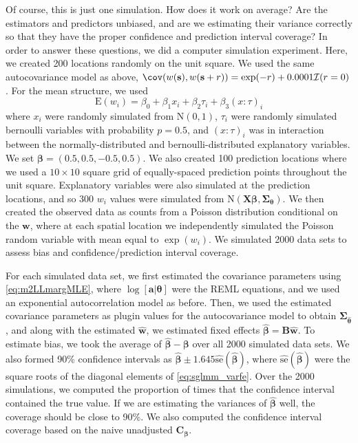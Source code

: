 \documentclass[12pt, titlepage]{article}
\begin{document}
Of course, this is just one simulation.  How does it work on average?  Are the estimators and predictors unbiased, and are we estimating their variance correctly so that they have the proper confidence and prediction interval coverage?  In order to answer these questions, we did a computer simulation experiment.  Here, we created 200 locations randomly on the unit square. We used the same autocovariance model as above, $\cov(w(\mathbf{s}),w(\mathbf{s} + r)) = \exp(-r) + 0.0001\mathcal{I}(r = 0)$.  For the mean structure, we used
$$
\textrm{E}(w_{i}) = \beta_{0} + \beta_{1}x_{i} + \beta_{2}\tau_{i} + \beta_{3}(x{:}\tau)_{i}
$$
where $x_{i}$ were randomly simulated from $\textrm{N}(0,1)$, $\tau_{i}$ were randomly simulated bernoulli variables with probability $p = 0.5$, and $(x{:}\tau)_{i}$ was in interaction between the normally-distributed and bernoulli-distributed explanatory variables.  We set $\mathbf{\beta} = (0.5, 0.5, -0.5, 0.5)$.  We also created 100 prediction locations where we used a $10 \times 10$ square grid of equally-spaced prediction points throughout the unit square.  Explanatory variables were also simulated at the prediction locations, and so 300 $w_{i}$ values were simulated from $\textrm{N}(\mathbf{X}\boldsymbol{\beta},\boldsymbol{\Sigma}_{\boldsymbol{\theta}})$. We then created the observed data as counts from a Poisson distribution conditional on the $\mathbf{w}$, where at each spatial location we independently simulated the Poisson random variable with mean equal to $\exp(w_{i})$.  We simulated 2000 data sets to assess bias and confidence/prediction interval coverage.

For each simulated data set, we first estimated the covariance parameters using \eqref{eq:m2LLmargMLE}, where $\log[\mathbf{a}|\mathbf{\theta}]$ were the REML equations, and we used an exponential autocorrelation model as before. Then, we used the estimated covariance parameters as plugin values for the autocovariance model to obtain $\boldsymbol{\Sigma}_{\hat{\boldsymbol{\theta}}}$, and along with the estimated $\hat{\mathbf{w}}$, we estimated fixed effects $\hat{\boldsymbol{\beta}} = \mathbf{B}\hat{\mathbf{w}}$.  To estimate bias, we took the average of $\hat{\boldsymbol{\beta}} - \boldsymbol{\beta}$ over all 2000 simulated data sets. We also formed 90\% confidence intervals as $\hat{\boldsymbol{\beta}} \pm 1.645 \widehat{\textrm{se}}(\hat{\boldsymbol{\beta}})$, where $\widehat{\textrm{se}}(\hat{\boldsymbol{\beta}})$ were the square roots of the diagonal elements of \eqref{eq:sglmm_varfe}.  Over the 2000 simulations, we computed the proportion of times that the confidence interval contained the true value.  If we are estimating the variances of $\hat{\boldsymbol{\beta}}$ well, the coverage should be close to 90\%. We also computed the confidence interval coverage based on the naive unadjusted $\mathbf{C}_{\boldsymbol{\beta}}$. 
\end{document}
